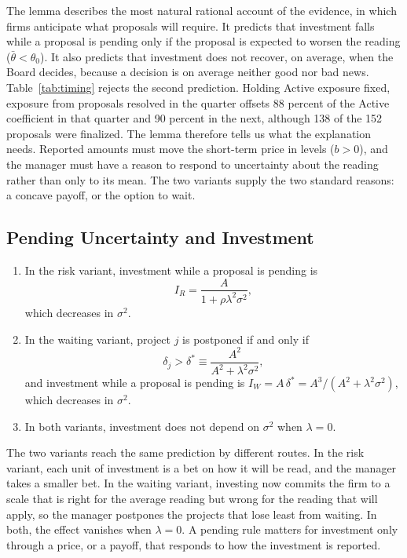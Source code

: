 The lemma describes the most natural rational account of the evidence, in which firms anticipate what proposals will require. It predicts that investment falls while a proposal is pending only if the proposal is expected to worsen the reading ($\bar\theta<\theta_0$). It also predicts that investment does not recover, on average, when the Board decides, because a decision is on average neither good nor bad news. Table~\ref{tab:timing} rejects the second prediction. Holding Active exposure fixed, exposure from proposals resolved in the quarter offsets 88 percent of the Active coefficient in that quarter and 90 percent in the next, although 138 of the 152 proposals were finalized. %
The lemma therefore tells us what the explanation needs. Reported amounts must move the short-term price in levels ($b>0$), and the manager must have a reason to respond to uncertainty about the reading rather than only to its mean. The two variants supply the two standard reasons: a concave payoff, or the option to wait.

\subsection{Pending Uncertainty and Investment}\label{sec:model:pending}

\begin{proposition}\label{prop:model:pending}
\leavevmode
\begin{enumerate}[label=(\roman*)]
  \item In the risk variant, investment while a proposal is pending is
  \[
    I_R=\frac{A}{1+\rho\lambda^{2}\sigma^{2}},
  \]
  which decreases in $\sigma^{2}$.
  \item In the waiting variant, project $j$ is postponed if and only if
  \[
    \delta_j>\delta^{*}\equiv\frac{A^{2}}{A^{2}+\lambda^{2}\sigma^{2}},
  \]
  and investment while a proposal is pending is $I_W=A\,\delta^{*}=A^{3}/(A^{2}+\lambda^{2}\sigma^{2})$, which decreases in $\sigma^{2}$.
  \item In both variants, investment does not depend on $\sigma^{2}$ when $\lambda=0$.
\end{enumerate}
\end{proposition}

The two variants reach the same prediction by different routes. In the risk variant, each unit of investment is a bet on how it will be read, and the manager takes a smaller bet. In the waiting variant, investing now commits the firm to a scale that is right for the average reading but wrong for the reading that will apply, so the manager postpones the projects that lose least from waiting. In both, the effect vanishes when $\lambda=0$. A pending rule matters for investment only through a price, or a payoff, that responds to how the investment is reported.

